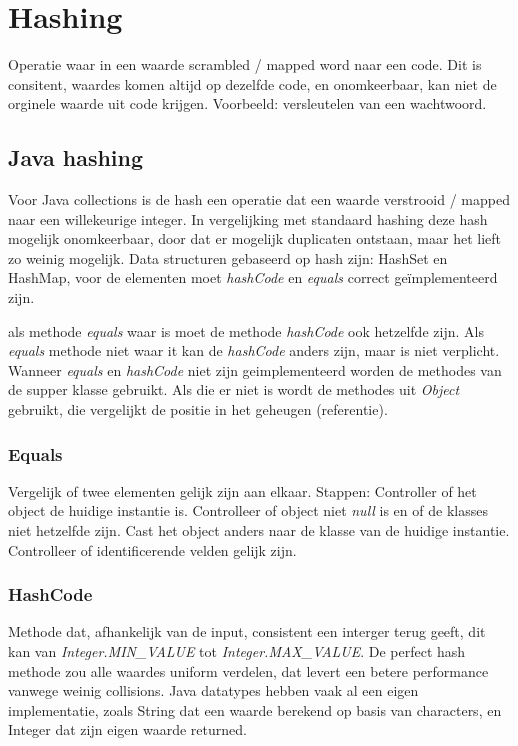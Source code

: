 \section{Hashing}
Operatie waar in een waarde scrambled / mapped word naar een code.
Dit is consitent, waardes komen altijd op dezelfde code, en onomkeerbaar, kan niet de orginele waarde uit code krijgen.
Voorbeeld: versleutelen van een wachtwoord.

\subsection{Java hashing}
Voor Java collections is de hash een operatie dat een waarde verstrooid / mapped naar een willekeurige integer.
In vergelijking met standaard hashing deze hash mogelijk onomkeerbaar, door dat er mogelijk duplicaten ontstaan, maar het lieft zo weinig mogelijk.
Data structuren gebaseerd op hash zijn: HashSet en HashMap, voor de elementen moet \textit{hashCode} en \textit{equals} correct geïmplementeerd zijn.

als methode \textit{equals} waar is moet de methode \textit{hashCode} ook hetzelfde zijn.
Als \textit{equals} methode niet waar it kan de \textit{hashCode} anders zijn, maar is niet verplicht.
Wanneer \textit{equals} en \textit{hashCode} niet zijn geimplementeerd worden de methodes van de supper klasse gebruikt.
Als die er niet is wordt de methodes uit \textit{Object} gebruikt, die vergelijkt de positie in het geheugen (referentie).

\subsubsection{Equals}
Vergelijk of twee elementen gelijk zijn aan elkaar.
Stappen:
Controller of het object de huidige instantie is.
Controlleer of object niet \textit{null} is en of de klasses niet hetzelfde zijn.
Cast het object anders naar de klasse van de huidige instantie.
Controlleer of identificerende velden gelijk zijn.

\subsubsection{HashCode}
Methode dat, afhankelijk van de input, consistent een interger terug geeft, dit kan van \textit{Integer.MIN\_VALUE} tot \textit{Integer.MAX\_VALUE}.
De perfect hash methode zou alle waardes uniform verdelen, dat levert een betere performance vanwege weinig collisions.
Java datatypes hebben vaak al een eigen implementatie, zoals String dat een waarde berekend op basis van characters, en Integer dat zijn eigen waarde returned.

